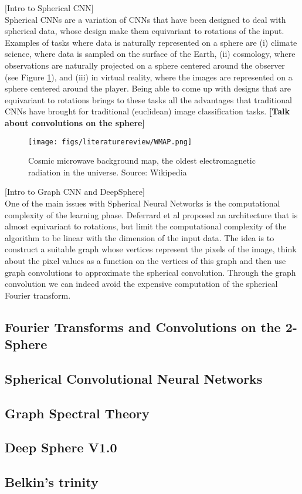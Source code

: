 [Intro to Spherical CNN]\\
Spherical CNNs are a variation of CNNs that have been designed to deal with spherical data, whose design make them equivariant to rotations of the input.  Examples of tasks where data is naturally represented on a sphere are (i) climate science, where data is sampled on the surface of the Earth, (ii) cosmology, where observations are naturally projected on a sphere centered around the observer (see Figure \ref{fig:cosmicradiation}), and (iii) in virtual reality, where the images are represented on a sphere centered around the player. Being able to come up with designs that are 	equivariant to rotations brings to these tasks all the advantages that traditional CNNs have brought for traditional (euclidean) image classification tasks. \textbf{[Talk about convolutions on the sphere]}

\begin{figure}
	\label{fig:cosmicradiation}
	\centering
	\caption{Cosmic microwave background map, the oldest electromagnetic radiation in the universe. Source: Wikipedia}
	\texttt{[image: figs/literaturereview/WMAP.png]}
\end{figure}

[Intro to Graph CNN and DeepSphere]\\
One of the main issues with Spherical Neural Networks is the computational complexity of the learning phase. Deferrard et al \cite{DeepSphere} proposed an architecture that is almost equivariant to rotations, but limit the computational complexity of the algorithm to be linear with the dimension of the input data. The idea is to construct a suitable graph whose vertices represent the pixels of the image, think about the pixel values as a function on the vertices of this graph and then use graph convolutions to approximate the spherical convolution. Through the graph convolution we can indeed avoid the expensive computation of the spherical Fourier transform.
\subsection{Fourier Transforms and Convolutions on the 2-Sphere}


\subsection{Spherical Convolutional Neural Networks}

\subsection{Graph Spectral Theory}

\subsection{Deep Sphere V1.0}

\subsection{Belkin's trinity}
